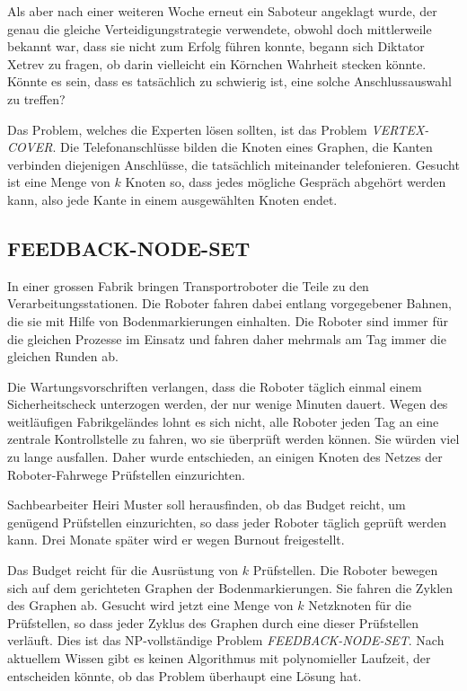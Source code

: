 Als aber nach einer weiteren Woche erneut ein Saboteur angeklagt wurde,
der genau die gleiche Verteidigungstrategie verwendete, obwohl
doch mittlerweile bekannt war, dass sie nicht zum Erfolg führen konnte,
begann sich Diktator Xetrev zu fragen, ob darin vielleicht
ein Körnchen Wahrheit stecken könnte.
Könnte es sein, dass 
es tatsächlich zu schwierig ist, eine solche Anschlussauswahl zu treffen?

\medskip

Das Problem, welches die Experten lösen sollten, ist das Problem
{\it VERTEX-COVER}.
Die Telefonanschlüsse bilden die Knoten eines Graphen,
die Kanten verbinden diejenigen Anschlüsse, die tatsächlich miteinander
telefonieren.
Gesucht ist eine Menge von $k$ Knoten so, dass jedes
mögliche Gespräch abgehört werden kann, also jede Kante in einem
ausgewählten Knoten endet.


\subsection{FEEDBACK-NODE-SET}
In einer grossen Fabrik bringen Transportroboter die Teile zu den
Verarbeitungsstationen.
Die Roboter fahren dabei entlang vorgegebener
Bahnen, die sie mit Hilfe von Bodenmarkierungen einhalten.
Die Roboter
sind immer für die gleichen Prozesse im Einsatz und fahren daher mehrmals
am Tag immer die gleichen Runden ab.

Die Wartungsvorschriften verlangen, dass die Roboter täglich einmal einem
Sicherheitscheck unterzogen werden, der nur wenige Minuten dauert.
Wegen
des weitläufigen Fabrikgeländes lohnt es sich nicht, alle Roboter jeden
Tag an eine zentrale Kontrollstelle zu fahren, wo sie überprüft werden
können.
Sie würden viel zu lange ausfallen.
Daher wurde entschieden, an
einigen Knoten des Netzes der Roboter-Fahrwege Prüfstellen einzurichten.

Sachbearbeiter Heiri Muster soll herausfinden, ob das Budget reicht,
um genügend Prüfstellen einzurichten, so dass jeder Roboter täglich
geprüft werden kann.
Drei Monate später wird er wegen Burnout freigestellt.

\medskip

Das Budget reicht für die Ausrüstung von $k$ Prüfstellen.
Die Roboter bewegen sich auf dem gerichteten Graphen der Bodenmarkierungen.
Sie fahren die Zyklen des Graphen ab.
Gesucht wird jetzt eine Menge
von $k$ Netzknoten für die Prüfstellen, so dass jeder Zyklus des Graphen
durch eine dieser Prüfstellen verläuft.
Dies ist das NP-vollständige Problem {\it FEEDBACK-NODE-SET}.
Nach aktuellem Wissen gibt es keinen Algorithmus mit polynomieller
Laufzeit, der entscheiden könnte, ob das Problem überhaupt eine
Lösung hat.

